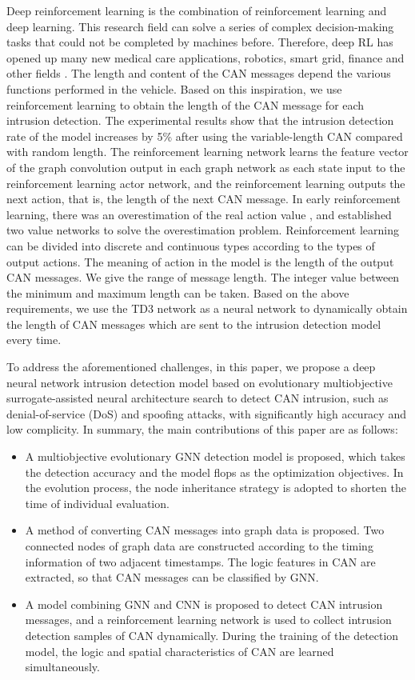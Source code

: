 \documentclass[lettersize,journal]{IEEEtran}
\begin{document}
Deep reinforcement learning is the combination of reinforcement learning and deep learning. This research field can solve a series of complex decision-making tasks that could not be completed by machines before. Therefore, deep RL has opened up many new medical care applications, robotics, smart grid, finance and other fields \cite{40}. The length and content of the CAN messages depend the various functions performed in the vehicle. Based on this inspiration, we use reinforcement learning to obtain the length of the CAN message for each intrusion detection. The experimental results show that the intrusion detection rate of the model increases by 5\% after using the variable-length CAN compared with random length. The reinforcement learning network learns the feature vector of the graph convolution output in each graph network as each state input to the reinforcement learning actor network, and the reinforcement learning outputs the next action, that is, the length of the next CAN message. In early reinforcement learning, there was an overestimation of the real action value \cite{41}, and \cite{42} established two value networks to solve the overestimation problem. Reinforcement learning can be divided into discrete and continuous types according to the types of output actions. The meaning of action in the model is the length of the output CAN messages. We give the range of message length. The integer value between the minimum and maximum length can be taken. Based on the above requirements, we use the TD3 \cite{43} network as a neural network to dynamically obtain the length of CAN messages which are sent to the intrusion detection model every time.

To address the aforementioned challenges, in this paper, we propose a deep neural network intrusion detection model based on evolutionary multiobjective surrogate-assisted neural architecture search to detect CAN intrusion, such as denial-of-service (DoS) and spoofing attacks, with significantly high accuracy and low complicity. In summary, the main contributions of this paper are as follows:
\begin{itemize}
\item{A multiobjective evolutionary GNN detection model is proposed, which takes the detection accuracy and the model flops as the optimization objectives. In the evolution process, the node inheritance strategy is adopted to shorten the time of individual evaluation.}
\item{A method of converting CAN messages into graph data is proposed. Two connected nodes of graph data are constructed according to the timing information of two adjacent timestamps. The logic features in CAN are extracted, so that CAN messages can be classified by GNN.}
\item{A model combining GNN and CNN is proposed to detect CAN intrusion messages, and a reinforcement learning network is used to collect intrusion detection samples of CAN dynamically. During the training of the detection model, the logic and spatial characteristics of CAN are learned simultaneously.}
\end{itemize}
\end{document}
